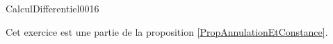 \begin{corrige}{CalculDifferentiel0016}

	Cet exercice est une partie de la proposition \ref{PropAnnulationEtConstance}.

\end{corrige}
